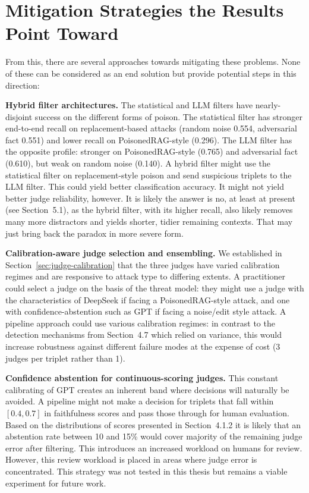 \section{Mitigation Strategies the Results Point Toward}

From this, there are several approaches towards mitigating these problems. None of these can be considered as an end solution but provide potential steps in this direction:

\textbf{Hybrid filter architectures.} The statistical and LLM filters have nearly-disjoint success on the different forms of poison. The statistical filter has stronger end-to-end recall on replacement-based attacks (random noise 0.554, adversarial fact 0.551) and lower recall on PoisonedRAG-style (0.296). The LLM filter has the opposite profile: stronger on PoisonedRAG-style (0.765) and adversarial fact (0.610), but weak on random noise (0.140). A hybrid filter might use the statistical filter on replacement-style poison and send suspicious triplets to the LLM filter. This could yield better classification accuracy. It might not yield better judge reliability, however. It is likely the answer is no, at least at present (see Section~5.1), as the hybrid filter, with its higher recall, also likely removes many more distractors and yields shorter, tidier remaining contexts. That may just bring back the paradox in more severe form.

\textbf{Calibration-aware judge selection and ensembling.} We established in Section~\ref{sec:judge-calibration} that the three judges have varied calibration regimes and are responsive to attack type to differing extents. A practitioner could select a judge on the basis of the threat model: they might use a judge with the characteristics of DeepSeek if facing a PoisonedRAG-style attack, and one with confidence-abstention such as GPT if facing a noise/edit style attack. A pipeline approach could use various calibration regimes: in contrast to the detection mechanisms from Section~4.7 which relied on variance, this would increase robustness against different failure modes at the expense of cost (3 judges per triplet rather than 1).

\textbf{Confidence abstention for continuous-scoring judges.} This constant calibrating of GPT creates an inherent band where decisions will naturally be avoided. A pipeline might not make a decision for triplets that fall within $[0.4,0.7]$ in faithfulness scores and pass those through for human evaluation. Based on the distributions of scores presented in Section~4.1.2 it is likely that an abstention rate between 10 and 15\% would cover majority of the remaining judge error after filtering.
This introduces an increased workload on humans for review. However, this review workload is placed in areas where judge error is concentrated. This strategy was not tested in this thesis but remains a viable experiment for future work.

